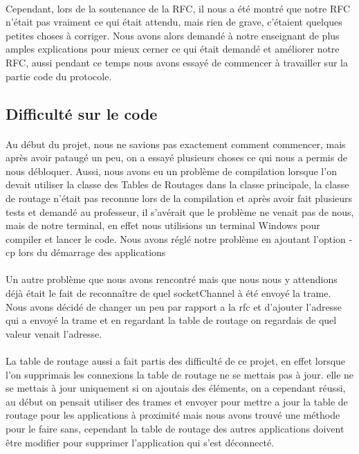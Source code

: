 \documentclass[a4paper,titlepage]{report}
\begin{document}
\paragraph{}
Cependant, lors de la soutenance de la RFC, il nous a été montré que notre RFC n'était pas vraiment ce qui était attendu, mais rien de grave, c'étaient quelques petites choses à corriger.
Nous avons alors demandé à notre enseignant de plus amples explications pour mieux cerner ce qui était demandé et améliorer notre RFC, aussi pendant ce temps nous avons essayé de commencer à travailler sur la partie code du protocole.
\subsection{Difficulté sur le code}
\paragraph{}
Au début du projet, nous ne savions pas exactement comment commencer, mais après avoir pataugé un peu, on a essayé plusieurs choses ce qui nous a permis  de nous débloquer.
Aussi, nous avons eu un problème de compilation lorsque l'on devait utiliser la classe des Tables de Routages dans la classe principale, la classe de routage n'était pas reconnue lors de la compilation et après avoir fait plusieurs tests et demandé au professeur, il s'avérait que le problème ne venait pas de nous, mais de notre terminal, en effet nous utilisions un terminal Windows pour compiler et lancer le code.
Nous avons réglé notre problème en ajoutant l'option -cp lors du démarrage des applications
\paragraph{}
Un autre problème que nous avons rencontré mais que nous nous y attendions déjà était le fait de reconnaître de quel socketChannel à été envoyé la trame.
Nous avons décidé de changer un peu par rapport a la rfc et d'ajouter l'adresse qui a envoyé la trame et en regardant la table de routage on regardais de quel valeur venait l'adresse.
\paragraph{}
La table de routage aussi a fait partis des difficulté de ce projet, en effet lorsque l'on supprimais les connexions la table de routage ne se mettais pas à jour. elle ne se mettais à jour uniquement si on ajoutais des éléments, on a cependant réussi, au début on pensait utiliser des trames et envoyer pour mettre a jour la table de routage pour les applications à proximité mais nous avons trouvé une méthode pour le faire sans, cependant la table de routage des autres applications doivent être modifier pour supprimer l'application qui s'est déconnecté.
\end{document}

